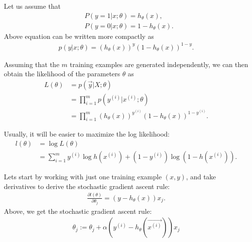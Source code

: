 \documentclass[10pt,onecolumn]{book}
\begin{document}
Let us assume that 
\begin{equation}
\begin{split}
& P(y = 1 | x;\theta) = h_\theta(x), \\
& P(y = 0 | x; \theta) = 1 - h_\theta(x).
\end{split}
\end{equation}
Above equation can be written more compactly as
\begin{equation}
\begin{split}
p(y|x;\theta) = (h_\theta(x)) ^y (1- h_\theta(x))^{1 - y}.
\end{split}
\end{equation}

Assuming that the $m$ training examples are generated independently, we can then obtain the likelihood of the parameters $\theta$ as
\begin{equation}
\begin{split}
L(\theta) &= p(\vec{y} | X; \theta) \\
			&= \prod_{i=1}^m p(y^{(i)} | x^{(i)}; \theta)\\
			&= \prod_{i=1}^m (h_\theta(x)) ^{y^{(i)}} (1- h_\theta(x))^{1 - y^{(i)}}.
\end{split}
\end{equation}

Usually, it will be easier to maximize the log likelihood:
\begin{equation}
\begin{split}
l(\theta) &= \log L(\theta) \\ 
		&= \sum_{i=1}^m y^{(i)} \log h(x^{(i)}) + (1 - y^{(i)}) \log (1 - h(x^{(i)})).
\end{split}
\end{equation}


Lets start by working with just one training example $(x, y)$, and take derivatives to derive the stochastic gradient ascent rule:
\begin{equation}
\begin{split}
\frac{\partial l(\theta)}{\partial \theta_j} = (y - h_\theta(x)) x_j.
\end{split}
\end{equation}
Above, we get the stochastic gradient ascent rule:
\begin{equation}
\begin{split}
\theta_j := \theta_j + \alpha (y^{(i)} - h_\theta(\overrightarrow{{x^{(i)}}}))x_j
\end{split}
\end{equation}
\end{document}
